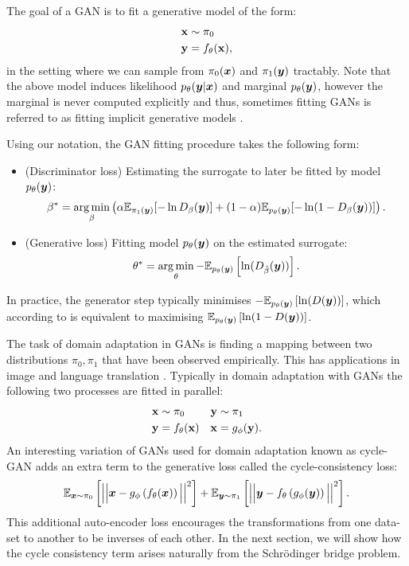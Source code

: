 \documentclass[a4paper,12pt,twoside,openright]{report}
\theoremstyle{definition}
\begin{document}
The goal of a GAN \citep{goodfellow2014generative} is to fit a generative model of the form:
\begin{align*}
    {\mathbf{x}} &\sim \pi_0 \\
    {\mathbf{y}} &= f_{\theta}({\mathbf{x}}),
\end{align*}
in the setting where we can sample from $\pi_0({\bm{x}})$ and $\pi_1({\bm{y}})$ tractably. Note that the above model induces likelihood $p_{\theta}({\bm{y}} | {\bm{x}})$ and marginal $p_{\theta}({\bm{y}})$, however the marginal is never computed explicitly and thus, sometimes fitting GANs is referred to as fitting implicit generative models \citep{mohamed2016learning}.

Using our notation, the GAN fitting procedure \citep{goodfellow2014generative} takes the following form:

\begin{itemize}
    \item (Discriminator loss) Estimating the surrogate to later be fitted by model $p_{\theta}({\bm{y}})$:
 $$ {\beta}^{*} = \operatorname*{arg\,min}_{\beta} \left(\alpha \mathbb{E}_{\pi_1({\bm{y}})}[-\operatorname{ln} D_{\beta}({\bm{y}})] + (1-\alpha)\mathbb{E}_{p_{\theta}({\bm{y}})}[-\operatorname{ln} (1-D_{\beta}({\bm{y}}))]\right).$$ 
 \item (Generative loss) Fitting model $p_{\theta}({\bm{y}})$ on the estimated surrogate:
 $$\theta^{*} = \operatorname*{arg\,min}_{\theta}-\mathbb{E}_{p_{\theta}({\bm{y}})}\left[\operatorname{ln}(D_{\hat{\beta}}({\bm{y}}))\right].$$ 
\end{itemize}

In practice, the generator step \citep{goodfellow2014generative} typically minimises $-\mathbb{E}_{p_{\theta}({\bm{y}})}\left[\operatorname{ln}(D({\bm{y}}))\right]$, which according to \cite{goodfellow2014generative} is equivalent to maximising  $\mathbb{E}_{p_{\theta}({\bm{y}})}\left[\operatorname{ln}(1-D({\bm{y}}))\right]$.

The task of domain adaptation in GANs is finding a mapping between two distributions $\pi_0, \pi_1$ that have been observed empirically. This has applications in image and language translation \citep{zhu2017unpaired,lample2017unsupervised}. Typically in domain adaptation with GANs the following two processes are fitted in parallel:
\begin{align*}
    {\mathbf{x}} &\sim \pi_0    &{\mathbf{y}} &\sim \pi_1\\
    {\mathbf{y}} &= f_{\theta}({\mathbf{x}})   &{\mathbf{x}} &= g_{\phi}({\mathbf{y}}).
\end{align*}
An interesting variation of GANs used for domain adaptation known as cycle-GAN adds an extra term to the generative loss called the cycle-consistency loss:
\begin{align*}
   \mathbb{E}_{{\bm{x}} \sim \pi_0}\left[ \Big|\Big|{\bm{x}}- g_\phi\left(f_\theta({\bm{x}}) \right) \Big|\Big|^2\right] +  \mathbb{E}_{{\bm{y}} \sim \pi_1}\left[ \Big|\Big|{\bm{y}}- f_\theta\left(g_\phi({\bm{y}}) \right) \Big|\Big|^2\right].
\end{align*}
This additional auto-encoder loss encourages the transformations from one data-set to another to be inverses of each other. In the next section, we will show how the cycle consistency term arises naturally from the Schrödinger bridge problem.
\end{document}
